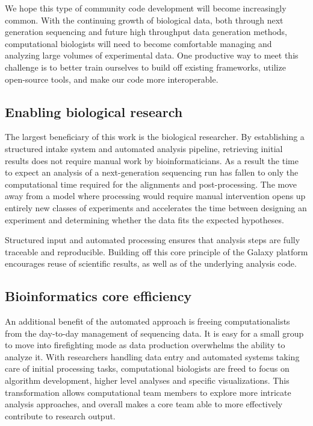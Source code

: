 \documentclass[10pt]{bmc_article}
\newenvironment{bmcformat}{\begin{raggedright}\baselineskip20pt\sloppy\setboolean{publ}{false}}{\end{raggedright}\baselineskip20pt\sloppy}
\begin{document}
\begin{bmcformat}
We hope this type of community code development will become
increasingly common. With the continuing growth of biological data,
both through next generation sequencing and future high throughput
data generation methods, computational biologists will need to become
comfortable managing and analyzing large volumes of experimental
data. One productive way to meet this challenge is to better train
ourselves to build off existing frameworks, utilize open-source tools,
and make our code more interoperable.

\subsection*{Enabling biological research}

The largest beneficiary of this work is the biological
researcher. By establishing a structured intake
system and automated analysis pipeline, retrieving initial results
does not require manual work by bioinformaticians. As a result
the time to expect an analysis of a next-generation sequencing run has
fallen to only the computational time required for the alignments and
post-processing. The move away from a model where processing would
require manual intervention opens up entirely new classes of
experiments and accelerates the time between designing an experiment
and determining whether the data fits the expected hypotheses.

Structured input and automated processing ensures that analysis steps
are fully traceable and reproducible. Building off this core principle
of the Galaxy platform encourages reuse of scientific results, as well
as of the underlying analysis code.

\subsection*{Bioinformatics core efficiency}

An additional benefit of the automated approach is freeing
computationalists from the day-to-day management of
sequencing data. It is easy for a small group to move into
firefighting mode as data production overwhelms the ability to
analyze it. With researchers handling data entry and automated systems
taking care of initial processing tasks, computational biologists are
freed to focus on algorithm development, higher level analyses and
specific visualizations. This transformation allows computational team
members to explore more intricate analysis approaches, and overall
makes a core team able to more effectively contribute to research
output.


\end{bmcformat}
\end{document}
